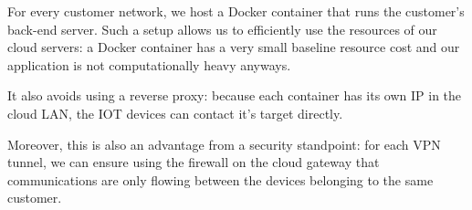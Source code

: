 \documentclass[paper=a4, fontsize=11pt]{scrartcl}
\begin{document}
For every customer network, we host a Docker container that runs the customer's
back-end server.
Such a setup allows us to efficiently use the resources of our cloud servers: a
Docker container has a very small baseline resource cost and our application is
not computationally heavy anyways.

It also avoids using a reverse proxy: because each container has its own IP in
the cloud LAN, the IOT devices can contact it's target directly.

Moreover, this is also an advantage from a security standpoint: for each VPN
tunnel, we can ensure using the firewall on the cloud gateway that
communications are only flowing between the devices belonging to the same
customer.
\end{document}
